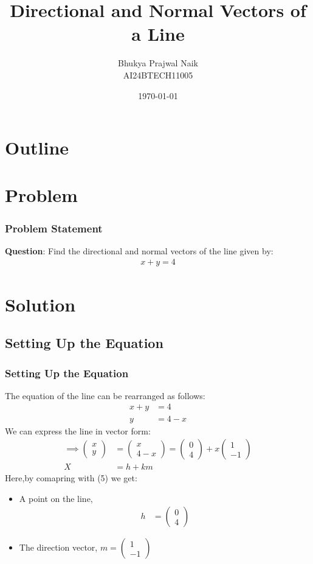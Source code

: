 \documentclass{beamer}
\title{Directional and Normal Vectors of a Line}
\author{Bhukya Prajwal Naik \\ AI24BTECH11005}
\date{\today}
\newcommand{\myvec}[1]{\begin{pmatrix}#1\end{pmatrix}}
\begin{document}
\begin{frame}
  \titlepage
\end{frame}

\section*{Outline}
\begin{frame}
  \tableofcontents
\end{frame}

\section{Problem}
\begin{frame}
  \frametitle{Problem Statement}
  \textbf{Question}: Find the directional and normal vectors of the line given by:
  \begin{align}
    x + y = 4
  \end{align}
\end{frame}

\section{Solution}
\subsection{Setting Up the Equation}
\begin{frame}
  \frametitle{Setting Up the Equation}
  The equation of the line can be rearranged as follows:
  \begin{align}
    x + y &= 4 \\
    y &= 4 - x
  \end{align}
  We can express the line in vector form:
  \begin{align}
   \implies \myvec{x \\ y} &=\myvec{x \\ 4-x} = \myvec{0 \\ 4} + x \myvec{1 \\ -1}\\
   X &=h+km
  \end{align}
  Here,by comapring with (5) we get:
  \begin{itemize}
    \item A point on the line,\begin{align} \ {h} &= \myvec{0 \\ 4} \ \end{align}
    \item The direction vector, \( {m} = \myvec{1 \\ -1} \)
  \end{itemize}
\end{frame}
\end{document}
